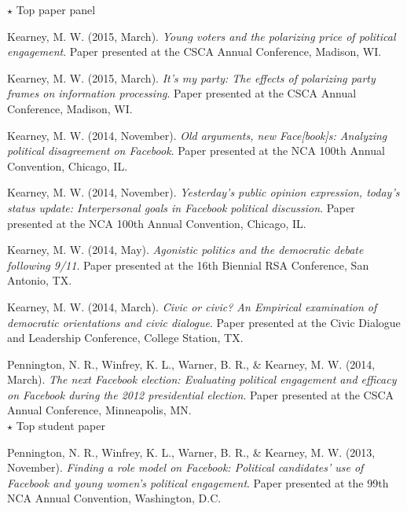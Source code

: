 \begin{bibenum}
      {$\star$} Top paper panel
    \item[] Kearney, M. W. (2015, March).
      \textit{Young voters and the polarizing price of political engagement}.
      Paper presented at the CSCA Annual Conference, Madison, WI.
    \item[] Kearney, M. W. (2015, March).
      \textit{It's my party: The effects of polarizing party frames on information processing}.
      Paper presented at the CSCA Annual Conference, Madison, WI.
    \item[] Kearney, M. W. (2014, November).
      \textit{Old arguments, new Face[book]s: Analyzing political disagreement on Facebook}.
      Paper presented at the NCA 100th Annual Convention, Chicago, IL.
    \item[] Kearney, M. W. (2014, November).
      \textit{Yesterday's public opinion expression, today's status update: Interpersonal goals in Facebook political discussion}.
      Paper presented at the NCA 100th Annual Convention, Chicago, IL.
    \item[] Kearney, M. W. (2014, May).
      \textit{Agonistic politics and the democratic debate following 9/11}.
      Paper presented at the 16th Biennial RSA Conference, San Antonio, TX.
    \item[] Kearney, M. W. (2014, March).
      \textit{Civic or civic? An Empirical examination of democratic orientations and civic dialogue}.
      Paper presented at the Civic Dialogue and Leadership Conference, College Station, TX.
    \item[] Pennington, N. R., Winfrey, K. L., Warner, B. R., \& Kearney, M. W. (2014, March).
      \textit{The next Facebook election: Evaluating political engagement and efficacy on Facebook during the 2012 presidential election}.
      Paper presented at the CSCA Annual Conference, Minneapolis, MN.\\
      {$\star$} Top student paper
    \item[] Pennington, N. R., Winfrey, K. L., Warner, B. R., \& Kearney, M. W. (2013, November).
      \textit{Finding a role model on Facebook: Political candidates' use of Facebook and young women's political engagement}.
      Paper presented at the 99th NCA Annual Convention, Washington, D.C.
  \end{bibenum}

  \vspace{1.5em}
